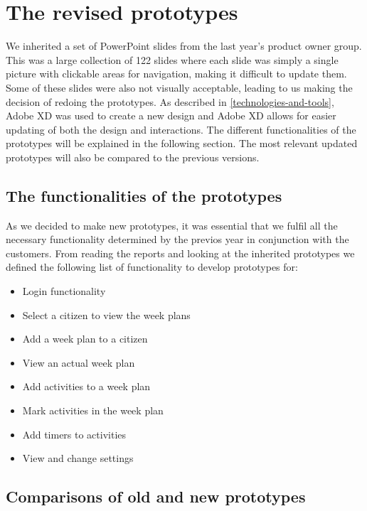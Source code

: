 \section{The revised prototypes}
We inherited a set of PowerPoint slides from the last year's product owner group.
This was a large collection of 122 slides where each slide was simply a single picture with clickable areas for navigation, making it difficult to update them.
Some of these slides were also not visually acceptable, leading to us making the decision of redoing the prototypes.
As described in \autoref{technologies-and-tools}, Adobe XD was used to create a new design and 
Adobe XD allows for easier updating of both the design and interactions.
The different functionalities of the prototypes will be explained in the following section.
The most relevant updated prototypes will also be compared to the previous versions.

\subsection{The functionalities of the prototypes}
As we decided to make new prototypes, it was essential that we fulfil all the necessary functionality determined by the previos year in conjunction with the customers.
From reading the reports and looking at the inherited prototypes we defined the following list of functionality to develop prototypes for:
\begin{itemize}
    \item Login functionality
    \item Select a citizen to view the week plans
    \item Add a week plan to a citizen
    \item View an actual week plan
    \item Add activities to a week plan
    \item Mark activities in the week plan
    \item Add timers to activities
    \item View and change settings
\end{itemize}

\subsection{Comparisons of old and new prototypes}

